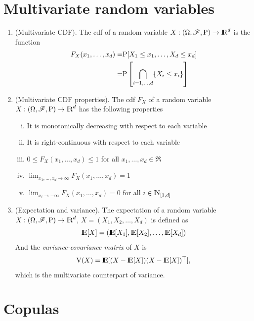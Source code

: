 \documentclass[a4paper,10pt]{scrbook}
\begin{document}
\section{Multivariate random variables}
\begin{enumerate}
 \item (Multivariate CDF). The cdf of a random variable \(X:\ofp\to\Re^d\) is the function 
       \begin{align*}
        F_X(x_1, \ldots, x_d) =& \mathrm{P}[X_1\leq x_1, \ldots, X_d \leq x_d]
        \\
        =& \mathrm{P}\left[\bigcap_{i=1,\ldots, d} \{X_i \leq x_i\}\right]
       \end{align*}
 \item (Multivariate CDF properties). The cdf \(F_X\) of a random variable \(X:\ofp\to\Re^d\)  
       has the following properties
       \begin{enumerate}[i.]
        \item It is monotonically decreasing with respect to each variable
        \item It is right-continuous with respect to each variable
        \item \(0 \leq F_X(x_1, \ldots, x_d)\leq 1\) for all \(x_1,\ldots, x_d\in\Re\)
        \item \(\lim_{x_1,\ldots, x_d\to\infty} F_X(x_1, \ldots, x_d) = 1\)
        \item \(\lim_{x_i\to-\infty} F_X(x_1, \ldots, x_d) = 0\) for all \(i\in\N_{[1,d]}\)
       \end{enumerate}
 \item (Expectation and variance). The expectation of a random variable \(X:\ofp\to\Re^d\), 
       \(X = (X_1, X_2,\ldots, X_d)\) is defined as 
       \[
        \E[X] = (\E[X_1], \E[X_2], \ldots, \E[X_d])
       \]
       And the \textit{variance-covariance matrix} of \(X\) is 
       \[
        \mathrm{V}(X) = \E[(X-\E[X])(X-\E[X])^{\top}],
       \]
       which is the multivariate counterpart of variance.


\end{enumerate}

\section{Copulas}
\end{document}
